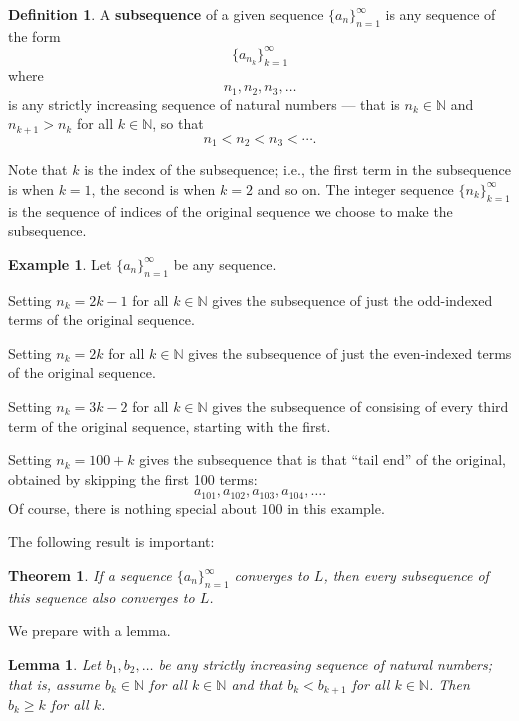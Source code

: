 \documentclass[12pt]{amsart}
\newcommand{\N}{\mathbb{N}}
\numberwithin{equation}{section}
\theoremstyle{plain} %
\newtheorem{thm}[equation]{Theorem}
\newtheorem{lem}[equation]{Lemma}
\theoremstyle{definition}
\newtheorem{defn}[equation]{Definition}
\newtheorem{ex}[equation]{Example}
\theoremstyle{remark}
\begin{document}
\begin{defn} A \textbf{subsequence} of a given sequence
  $\{a_n\}_{n=1}^\infty$ is any sequence of the form
$$
\{a_{n_k}\}_{k=1}^\infty 
$$
where 
$$
n_1, n_2, n_3, \dots
$$
is any strictly increasing sequence of natural numbers --- that is
$n_k \in \N$ and 
$n_{k+1} > n_k$ for all $k \in \N$, so that 
$$
n_1 < n_2 < n_3 < \cdots.
$$
\end{defn}

Note that $k$ is the index of the subsequence; i.e., the first term in the subsequence is when $k=1$, the second is when $k=2$ and so on. The integer sequence $\{n_k\}_{k=1}^\infty$ is the sequence of indices of the original sequence we choose to make the subsequence.

\begin{ex} Let $\{a_n\}_{n=1}^\infty$ be any sequence.

Setting $n_k = 2k-1$ for all $k \in \N$ gives the subsequence of just the odd-indexed terms of the
  original sequence. 

Setting $n_k = 2k$ for all $k \in \N$ gives the subsequence of just the even-indexed terms of the
  original sequence. 

Setting $n_k = 3k-2$ for all $k \in \N$ gives the subsequence of consising of every third term of the
  original sequence, starting with the first.

Setting $n_k = 100 + k$ gives the subsequence that is that ``tail
end'' of the original, obtained by skipping the first 100 terms:
$$
a_{101}, a_{102}, a_{103}, a_{104}, \dots.
$$
Of course, there is nothing special about $100$ in this example.
\end{ex}

The following result is important:



\begin{thm}\label{thm:ssq} If a sequence $\{a_n\}_{n=1}^\infty$ converges to $L$, then every subsequence of this sequence also converges to $L$.
\end{thm}

We prepare with a lemma.


\begin{lem} \label{lem211}
	Let $b_1, b_2, \dots$ be any strictly increasing sequence of natural numbers; that is, assume $b_k \in \N$ for all $k \in \N$ and that $b_k < b_{k+1}$ for 
	all $k \in \N$. Then $b_k \geq k$ for all $k$.
\end{lem}
\end{document}

